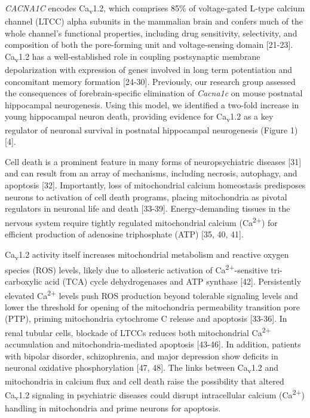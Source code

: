 \documentclass[]{article}
\begin{document}
\emph{CACNA1C} encodes Ca\textsubscript{v}1.2, which comprises 85\% of
voltage-gated L-type calcium channel (LTCC) alpha subunits in the
mammalian brain and confers much of the whole channel's functional
properties, including drug sensitivity, selectivity, and composition of
both the pore-forming unit and voltage-sensing domain {[}21-23{]}.
Ca\textsubscript{v}1.2 has a well-established role in coupling
postsynaptic membrane depolarization with expression of genes involved
in long term potentiation and concomitant memory formation {[}24-30{]}.
Previously, our research group assessed the consequences of
forebrain-specific elimination of \emph{Cacna1c} on mouse postnatal
hippocampal neurogenesis. 
Using this model, we identified a two-fold increase in young hippocampal 
neuron death, providing evidence for Ca\textsubscript{v}1.2 as a key regulator
 of neuronal survival in postnatal hippocampal neurogenesis (Figure 1) {[}4{]}.

Cell death is a prominent feature in many forms of neuropsychiatric
diseases {[}31{]} and can result from an array of mechanisms, including
necrosis, autophagy, and apoptosis {[}32{]}. 
Importantly, loss of mitochondrial calcium homeostasis predisposes neurons to activation of
cell death programs, placing mitochondria as pivotal regulators in
neuronal life and death {[}33-39{]}. 
Energy-demanding tissues in the nervous system require 
tightly regulated mitochondrial calcium (Ca\textsuperscript{2+}) 
for efficient production of adenosine triphosphate (ATP) {[}35, 40, 41{]}.

Ca\textsubscript{v}1.2 activity itself increases mitochondrial
metabolism and reactive oxygen species (ROS) levels, likely due to
allosteric activation of Ca\textsuperscript{2+}-sensitive tri-carboxylic
acid (TCA) cycle dehydrogenases and ATP synthase {[}42{]}. 
Persistently elevated Ca\textsuperscript{2+} levels push ROS production beyond
tolerable signaling levels and lower the threshold for opening of the
mitochondria permeability transition pore (PTP), priming mitochondria
cytochrome C release and apoptosis {[}33-36{]}.
In renal tubular cells, blockade of LTCCs reduces both mitochondrial Ca\textsuperscript{2+}
accumulation and mitochondria-mediated apoptosis {[}43-46{]}.
In addition, patients with bipolar disorder, schizophrenia, and major
depression show deficits in neuronal oxidative phosphorylation {[}47, 48{]}. 
The links between Ca\textsubscript{v}1.2 and mitochondria in
calcium flux and cell death raise the possibility that altered
Ca\textsubscript{v}1.2 signaling in psychiatric diseases could disrupt
intracellular calcium (Ca\textsuperscript{2+}) handling in mitochondria
and prime neurons for apoptosis.
\end{document}
